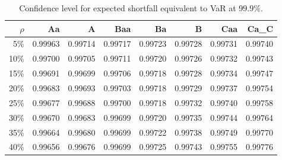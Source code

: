 \documentclass{article}
\begin{document}
\begin{table}
\begin{center}

\begin{tabular}{rrrrrrrr} \hline \hline
$\rho$ & Aa & A & Baa & Ba & B & Caa & Ca\_C \\ \hline
5\% & 0.99963 & 0.99714 & 0.99717 & 0.99723 & 0.99728 & 0.99731 & 0.99740 \\
10\% & 0.99700 & 0.99705 & 0.99711 & 0.99720 & 0.99726 & 0.99732 & 0.99743 \\
15\% & 0.99691 & 0.99699 & 0.99706 & 0.99718 & 0.99728 & 0.99734 & 0.99747 \\
20\% & 0.99683 & 0.99693 & 0.99703 & 0.99718 & 0.99729 & 0.99737 & 0.99754 \\
25\% & 0.99677 & 0.99688 & 0.99700 & 0.99718 & 0.99732 & 0.99740 & 0.99758 \\
30\% & 0.99670 & 0.99683 & 0.99699 & 0.99720 & 0.99735 & 0.99744 & 0.99764 \\
35\% & 0.99664 & 0.99680 & 0.99699 & 0.99722 & 0.99738 & 0.99749 & 0.99770 \\
40\% & 0.99656 & 0.99676 & 0.99699 & 0.99725 & 0.99743 & 0.99755 & 0.99776 \\
\hline
\end{tabular}
\end{center}
\label{tab:ES_CI}
\caption{Confidence level for expected shortfall equivalent to VaR at 99.9\%.}
\end{table}


\end{document}

